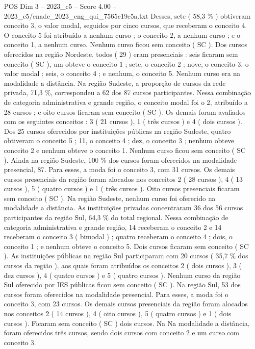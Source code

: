\begin{textsample}{POS Dim 3 – 2023\_c5 – Score 4.00 – 2023\_c5/enade\_2023\_eng\_qui\_7565c19e5a.txt}
Desses, sete ( 58,3 \% ) obtiveram conceito 3, o valor modal, seguidos por cinco cursos, que receberam o conceito 4.
O conceito 5 foi atribuído a nenhum curso ; o conceito 2, a nenhum curso ; e o conceito 1, a nenhum curso.
Nenhum curso ficou sem conceito ( SC ).
Dos cursos oferecidos na região Nordeste, todos ( 29 ) eram presenciais : seis ficaram sem conceito ( SC ), um obteve o conceito 1 ; sete, o conceito 2 ; nove, o conceito 3, o valor modal ; seis, o conceito 4 ; e nenhum, o conceito 5.
Nenhum curso era na modalidade a distância.
Na região Sudeste, a proporção de cursos da rede privada, 71,3 \%, correspondeu a 62 dos 87 cursos participantes.
Nessa combinação de categoria administrativa e grande região, o conceito modal foi o 2, atribuído a 28 cursos ; e oito cursos ficaram sem conceito ( SC ).
Os demais foram avaliados com os seguintes conceitos : 3 ( 21 cursos ), 1 ( três cursos ) e 4 ( dois cursos ).
Dos 25 cursos oferecidos por instituições públicas na região Sudeste, quatro obtiveram o conceito 5 ; 11, o conceito 4 ; dez, o conceito 3 ; nenhum obteve conceito 2 e nenhum obteve o conceito 1.
Nenhum curso ficou sem conceito ( SC ).
Ainda na região Sudeste, 100 \% dos cursos foram oferecidos na modalidade presencial, 87.
Para esses, a moda foi o conceito 3, com 31 cursos.
Os demais cursos presenciais da região foram alocados nos conceitos 2 ( 28 cursos ), 4 ( 13 cursos ), 5 ( quatro cursos ) e 1 ( três cursos ).
Oito cursos presenciais ficaram sem conceito ( SC ).
Na região Sudeste, nenhum curso foi oferecido na modalidade a distância.
As instituições privadas concentraram 36 dos 56 cursos participantes da região Sul, 64,3 \% do total regional.
Nessa combinação de categoria administrativa e grande região, 14 receberam o conceito 2 e 14 receberam o conceito 3 ( bimodal ) ; quatro receberam o conceito 4 ; dois, o conceito 1 ; e nenhum obteve o conceito 5.
Dois cursos ficaram sem conceito ( SC ).
As instituições públicas na região Sul participaram com 20 cursos ( 35,7 \% dos cursos da região ), aos quais foram atribuídos os conceitos 2 ( dois cursos ), 3 ( dez cursos ), 4 ( quatro cursos ) e 5 ( quatro cursos ).
Nenhum curso da região Sul oferecido por IES públicas ficou sem conceito ( SC ).
Na região Sul, 53 dos cursos foram oferecidos na modalidade presencial.
Para esses, a moda foi o conceito 3, com 23 cursos.
Os demais cursos presenciais da região foram alocados nos conceitos 2 ( 14 cursos ), 4 ( oito cursos ), 5 ( quatro cursos ) e 1 ( dois cursos ).
Ficaram sem conceito ( SC ) dois cursos.
Na Na modalidade a distância, foram oferecidos três cursos, sendo dois cursos com conceito 2 e um curso com conceito 3.

\end{textsample}
